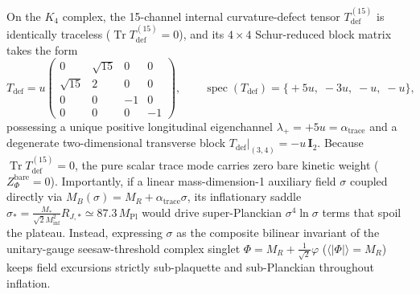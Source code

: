 \documentclass[11pt,a4paper]{article}
\begin{document}
On the $K_4$ complex, the 15-channel internal curvature-defect tensor $T_{\mathrm{def}}^{(15)}$ is identically traceless ($\operatorname{Tr}T_{\mathrm{def}}^{(15)} = 0$), and its $4\times 4$ Schur-reduced block matrix takes the form \cite{Olcsak2026Zenodo}
\begin{equation}
T_{\mathrm{def}} = u \begin{pmatrix} 0 & \sqrt{15} & 0 & 0 \\ \sqrt{15} & 2 & 0 & 0 \\ 0 & 0 & -1 & 0 \\ 0 & 0 & 0 & -1 \end{pmatrix}, \qquad \operatorname{spec}(T_{\mathrm{def}}) = \bigl\{+5u,\;-3u,\;-u,\;-u\bigr\},
\label{eq:tdef-matrix}
\end{equation}
possessing a unique positive longitudinal eigenchannel $\lambda_+ = +5u = \alpha_{\mathrm{trace}}$ and a degenerate two-dimensional transverse block $T_{\mathrm{def}}|_{(3,4)} = -u\,\mathbf{I}_2$. Because $\operatorname{Tr}T_{\mathrm{def}}^{(15)} = 0$, the pure scalar trace mode carries zero bare kinetic weight ($Z_\Phi^{\mathrm{bare}} = 0$). Importantly, if a linear mass-dimension-1 auxiliary field $\sigma$ coupled directly via $M_B(\sigma) = M_R + \alpha_{\mathrm{trace}}\sigma$, its inflationary saddle $\sigma_* = \frac{M_*}{\sqrt{2}M_{\mathrm{inf}}^2}R_{J,*} \simeq 87.3\,M_{\mathrm{Pl}}$ would drive super-Planckian $\sigma^4\ln\sigma$ terms that spoil the plateau. Instead, expressing $\sigma$ as the composite bilinear invariant of the unitary-gauge seesaw-threshold complex singlet $\Phi = M_R + \frac{1}{\sqrt{2}}\varphi$ ($\langle|\Phi|\rangle = M_R$) keeps field excursions strictly sub-plaquette and sub-Planckian throughout inflation.
\end{document}
